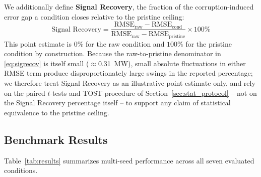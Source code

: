 \documentclass[conference]{IEEEtran}
\begin{document}
We additionally define \textbf{Signal Recovery}, the fraction of the corruption-induced error gap a condition closes relative to the pristine ceiling:
\begin{equation}
\text{Signal Recovery} = \frac{\text{RMSE}_{\text{raw}} - \text{RMSE}_{\text{cond}}}{\text{RMSE}_{\text{raw}} - \text{RMSE}_{\text{pristine}}} \times 100\%
\label{eq:sigrecov}
\end{equation}
This point estimate is $0\%$ for the raw condition and $100\%$ for the pristine condition by construction. Because the raw-to-pristine denominator in \eqref{eq:sigrecov} is itself small ($\approx$0.31~MW), small absolute fluctuations in either RMSE term produce disproportionately large swings in the reported percentage; we therefore treat Signal Recovery as an illustrative point estimate only, and rely on the paired $t$-tests and TOST procedure of Section~\ref{sec:stat_protocol} -- not on the Signal Recovery percentage itself -- to support any claim of statistical equivalence to the pristine ceiling.

\subsection{Benchmark Results}
Table~\ref{tab:results} summarizes multi-seed performance across all seven evaluated conditions.
\end{document}
